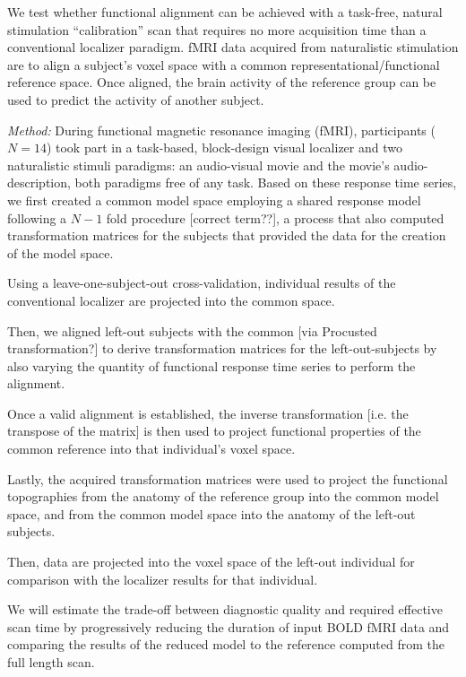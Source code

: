 %
We test whether functional alignment can be achieved with a task-free, natural
stimulation ``calibration'' scan that requires no more acquisition time than a
conventional localizer paradigm.
%
fMRI data acquired from naturalistic stimulation are to align a subject's voxel
space with a common representational/functional reference space.
%
Once aligned, the brain activity of the reference group can be used to predict
the activity of another subject.


\textit{Method:}
During functional magnetic resonance imaging (fMRI), participants ($N=14$) took
part in a task-based, block-design visual localizer and two naturalistic stimuli
paradigms: an audio-visual movie and the movie's audio-description, both
paradigms free of any task.
Based on these response time series, we first created a common model space
employing a shared response model \citep{chen2015reduced} following a $N-1$ fold
procedure [correct term??], a process that also computed transformation matrices
for the subjects that provided the data for the creation of the model space.

%
Using a leave-one-subject-out cross-validation, individual results of the
conventional localizer are projected into the common space.

Then, we aligned left-out subjects with the common [via Procusted
transformation?] to derive transformation matrices for the left-out-subjects by
also varying the quantity of functional response time series to perform the
alignment.

%
Once a valid alignment is established, the inverse transformation [i.e. the
transpose of the matrix] is then used to project functional properties of the
common reference into that individual's voxel space.

Lastly, the acquired transformation matrices were used to project the functional
topographies from the anatomy of the reference group into the common model
space, and from the common model space into the anatomy of the left-out
subjects.

%
Then, data are projected into the voxel space of the left-out individual for
comparison with the localizer results for that individual.

%
We will estimate the trade-off between diagnostic quality and required effective
scan time by progressively reducing the duration of input BOLD fMRI data and
comparing the results of the reduced model to the reference computed from the
full length scan.

